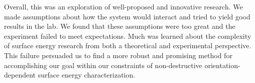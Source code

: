 Overall, this was an exploration of well-proposed and innovative research. We made assumptions about how the system would interact and tried to yield good results in the lab. We found that these assumptions were too great and the experiment failed to meet expectations. Much was learned about the complexity of surface energy research from both a theoretical and experimental perspective. This failure persuaded us to find a more robust and promising method for accomplishing our goal within our constraints of non-destructive orientation-dependent surface energy characterization. 


%		
%		
